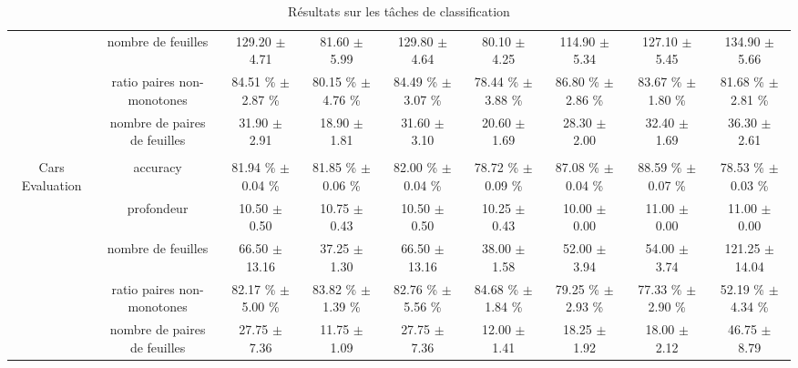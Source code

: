 \documentclass[a4paper]{article}
\begin{document}
\begin{table}
{\begin{tabular}{|*{9}{c|}}
    & nombre de feuilles & 129.20 $\pm$ 4.71& 81.60 $\pm$ 5.99& 129.80 $\pm$ 4.64& 80.10 $\pm$ 4.25& 114.90 $\pm$ 5.34& 127.10 $\pm$ 5.45& 134.90 $\pm$ 5.66 \\

    & ratio paires non-monotones & 84.51 \% $\pm$ 2.87 \%& 80.15 \% $\pm$ 4.76 \%& 84.49 \% $\pm$ 3.07 \%& 78.44 \% $\pm$ 3.88 \%& 86.80 \% $\pm$ 2.86 \%& 83.67 \% $\pm$ 1.80 \%& 81.68 \% $\pm$ 2.81 \% \\

    & nombre de paires de feuilles & 31.90 $\pm$ 2.91& 18.90 $\pm$ 1.81& 31.60 $\pm$ 3.10& 20.60 $\pm$ 1.69& 28.30 $\pm$ 2.00& 32.40 $\pm$ 1.69& 36.30 $\pm$ 2.61 \\

    & & & & & & & & \\

    Cars Evaluation & accuracy  & 81.94 \% $\pm$ 0.04 \% & 81.85 \% $\pm$ 0.06 \% & 82.00 \% $\pm$ 0.04 \% & 78.72 \% $\pm$ 0.09 \% & 87.08 \% $\pm$ 0.04 \% & 88.59 \% $\pm$ 0.07 \% & 78.53 \% $\pm$ 0.03 \% \\

    & profondeur  & 10.50 $\pm$ 0.50& 10.75 $\pm$ 0.43& 10.50 $\pm$ 0.50& 10.25 $\pm$ 0.43& 10.00 $\pm$ 0.00& 11.00 $\pm$ 0.00& 11.00 $\pm$ 0.00 \\
    & nombre de feuilles  & 66.50 $\pm$ 13.16& 37.25 $\pm$ 1.30& 66.50 $\pm$ 13.16& 38.00 $\pm$ 1.58& 52.00 $\pm$ 3.94& 54.00 $\pm$ 3.74& 121.25 $\pm$ 14.04 \\
    & ratio paires non-monotones & 82.17 \% $\pm$ 5.00 \%& 83.82 \% $\pm$ 1.39 \%& 82.76 \% $\pm$ 5.56 \%& 84.68 \% $\pm$ 1.84 \%& 79.25 \% $\pm$ 2.93 \%& 77.33 \% $\pm$ 2.90 \%& 52.19 \% $\pm$ 4.34 \% \\
    & nombre de paires de feuilles & 27.75 $\pm$ 7.36& 11.75 $\pm$ 1.09& 27.75 $\pm$ 7.36& 12.00 $\pm$ 1.41& 18.25 $\pm$ 1.92& 18.00 $\pm$ 2.12& 46.75 $\pm$ 8.79 \\

    \hline

\hline
\end{tabular}}
\caption{Résultats sur les tâches de classification}
\label{tab:resultats-classification}
\end{table}
\end{document}
